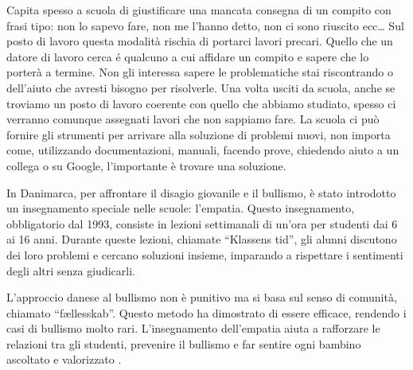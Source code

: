 \documentclass[12pt]{book} %
\begin{document}
Capita spesso a scuola di giustificare una mancata consegna di un compito con frasi tipo: non lo sapevo fare, non me
l'hanno detto, non ci sono riuscito ecc… Sul posto di lavoro questa modalità rischia di portarci lavori precari. Quello che un datore di lavoro cerca é qualcuno a cui affidare un compito e sapere che lo porterà a termine.
Non gli interessa sapere le problematiche stai riscontrando o dell'aiuto che avresti bisogno per risolverle. Una
volta usciti da scuola, anche se troviamo un posto di lavoro coerente con
quello che abbiamo studiato, spesso ci verranno comunque assegnati lavori che non sappiamo fare. La scuola ci può fornire gli strumenti per
arrivare alla soluzione di problemi nuovi, non importa come, utilizzando documentazioni, manuali, facendo prove,
chiedendo aiuto a un collega o su Google, l'importante è trovare una soluzione. 

\begin{mdframed}[linewidth=1pt]
In Danimarca, per affrontare il disagio giovanile e il bullismo, è stato introdotto un insegnamento speciale nelle scuole: l’empatia. Questo insegnamento, obbligatorio dal 1993, consiste in lezioni settimanali di un’ora per studenti dai 6 ai 16 anni. Durante queste lezioni, chiamate “Klassens tid”, gli alunni discutono dei loro problemi e cercano soluzioni insieme, imparando a rispettare i sentimenti degli altri senza giudicarli.

L’approccio danese al bullismo non è punitivo ma si basa sul senso di comunità, chiamato “fællesskab”. Questo metodo ha dimostrato di essere efficace, rendendo i casi di bullismo molto rari. L’insegnamento dell’empatia aiuta a rafforzare le relazioni tra gli studenti, prevenire il bullismo e far sentire ogni bambino ascoltato e valorizzato    .
\end{mdframed}

\bigskip
\end{document}
